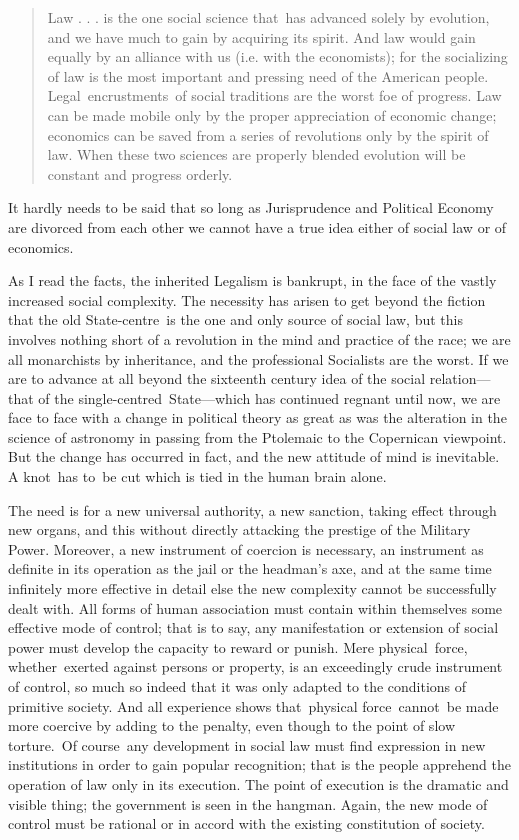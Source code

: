 \documentclass[twoside,symmetric,nobib,justified]{tufte-book}
\begin{document}
\begin{quote}
Law . . . is the one social science that~has advanced solely by
evolution, and we have much to gain by acquiring its spirit. And law
would gain equally by an alliance with us (i.e. with the economists);
for the socializing of law is the most important and pressing need of
the American people. Legal~encrustments~of social traditions are the
worst foe of progress. Law can be made mobile only by the proper
appreciation of economic change; economics can be saved from a series of
revolutions only by the spirit of law. When these two sciences are
properly blended evolution will be constant and progress orderly.~
\end{quote}

It hardly needs to be said that so long as Jurisprudence and Political
Economy are divorced from each other we cannot have a true idea either
of social law or of economics.~

As I read the facts, the inherited Legalism is bankrupt, in the face of
the vastly increased social complexity. The necessity has arisen to get
beyond the fiction that the old State-centre~is the one and only source
of social law, but this involves nothing short of a revolution in the
mind and practice of the race; we are all monarchists by inheritance,
and the professional Socialists are the worst. If we are to advance at
all beyond the sixteenth century idea of the social relation---that of
the single-centred~State---which has continued regnant until now, we are
face to face with a change in political theory as great as was the
alteration in the science of astronomy in passing from the Ptolemaic to
the Copernican viewpoint. But the change has occurred in fact, and the
new attitude of mind is inevitable. A knot~has to~be cut which is tied
in the human brain alone.~

The need is for a new universal authority, a new sanction, taking effect
through new organs, and this without directly attacking the prestige of
the Military Power. Moreover, a new instrument of coercion is necessary,
an instrument as definite in its operation as the jail or the headman's
axe, and at the same time infinitely more effective in detail else the
new complexity cannot be successfully dealt with. All forms of human
association must contain within themselves some effective mode of
control; that is to say, any manifestation or extension of social power
must develop the capacity to reward or punish. Mere physical~force,
whether~exerted against persons or property, is an exceedingly crude
instrument of control, so much so indeed that it was only adapted to the
conditions of primitive society. And all experience shows that~physical
force~cannot~be made more coercive by adding to the penalty, even though
to the point of slow torture.~Of course~any development in social law
must find expression in new institutions in order to gain popular
recognition; that is the people apprehend the operation of law only in
its execution. The point of execution is the dramatic and visible thing;
the government is seen in the hangman. Again, the new mode of control
must be rational or in accord with the existing constitution of
society.~
\end{document}

